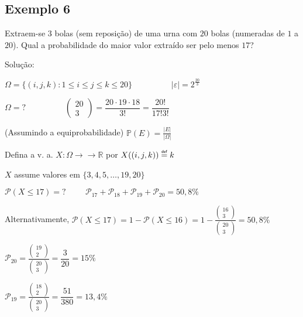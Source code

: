 \documentclass[a4paper]{article}
\newcommand\defeq{\mathrel{\overset{\makebox[0pt]{\mbox{\normalfont\tiny\sffamily def}}}{=}}}
\begin{document}
	\subsection{Exemplo 6}
	
	\noindent Extraem-se $3$ bolas (sem reposição) de uma urna com $20$ bolas (numeradas de $1$ a $20$). Qual a probabilidade do maior valor extraído ser pelo menos $17$?
	
	Solução:
	
	$\varOmega = \{(i,j,k): 1 \leq i \leq j \leq k \leq 20\} \hspace{2cm} |\varepsilon|= 2^{\frac{20}{3}}$
	
	$\varOmega = ? \hspace{2cm} \begin{pmatrix}
		20 \\
		3
	\end{pmatrix} = \dfrac{20 \cdot 19 \cdot 18}{3!} = \dfrac{20!}{17!3!}$
	
	(Assumindo a equiprobabilidade) \hspace{2cm} $\mathbb{P}(E) = \frac{|E|}{|\varOmega|}$
	
	Defina a v. a. $X: \varOmega \rightarrow \rightarrow \mathbb{R}$ por $X((i,j,k)) \defeq k$
	
	$X$ assume valores em $\{3,4,5,\dots,19,20\}$
	
	$\mathcal{P}(X \leq 17) = ? \hspace{1cm} \mathcal{P}_{17} + \mathcal{P}_{18} + \mathcal{P}_{19} + \mathcal{P}_{20} = 50,8\%$
	
	Alternativamente, $\mathcal{P}(X \leq 17) = 1-\mathcal{P}(X \leq 16) = 1 - \frac{\begin{pmatrix}
		16 \\
		3
		\end{pmatrix}}{\begin{pmatrix}
		20 \\
		3
		\end{pmatrix}} = 50,8\%$
	
	$\mathcal{P}_{20} = \frac{\begin{pmatrix}
		19 \\
		2
		\end{pmatrix}}{\begin{pmatrix}
		20 \\
		3
		\end{pmatrix}} = \dfrac{3}{20} = 15\%$
	
	$\mathcal{P}_{19} = \frac{\begin{pmatrix}
		18 \\
		2
		\end{pmatrix}}{\begin{pmatrix}
		20 \\
		3
		\end{pmatrix}} = \dfrac{51}{380} = 13,4\%$
	
\end{document}

